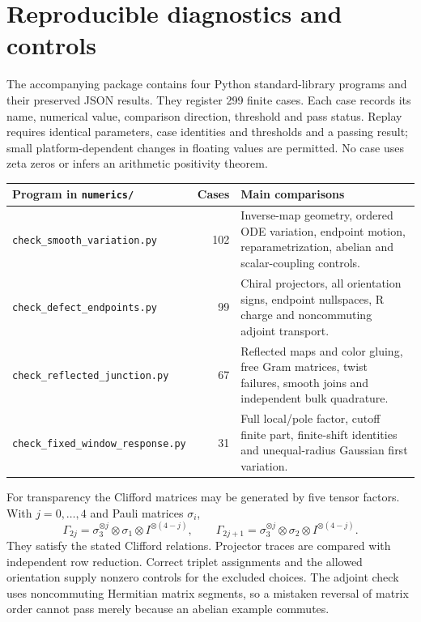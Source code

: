 \section{Reproducible diagnostics and controls}\label{app:diagnostics}

The accompanying package contains four Python standard-library
programs and their preserved JSON results. They register 299 finite
cases. Each case records its name, numerical value, comparison
direction, threshold and pass status. Replay requires identical
parameters, case identities and thresholds and a passing result;
small platform-dependent changes in floating values are permitted.
No case uses zeta zeros or infers an arithmetic positivity theorem.

\begin{center}
\begin{tabular}{@{}p{}rp{}@{}}
\toprule
Program in \texttt{numerics/} & Cases & Main comparisons\\
\midrule
\nolinkurl{check_smooth_variation.py} & 102 &
Inverse-map geometry, ordered ODE variation, endpoint motion,
reparametrization, abelian and scalar-coupling controls.\\
\nolinkurl{check_defect_endpoints.py} & 99 &
Chiral projectors, all orientation signs, endpoint nullspaces,
R charge and noncommuting adjoint transport.\\
\nolinkurl{check_reflected_junction.py} & 67 &
Reflected maps and color gluing, free Gram matrices, twist failures,
smooth joins and independent bulk quadrature.\\
\nolinkurl{check_fixed_window_response.py} & 31 &
Full local/pole factor, cutoff finite part, finite-shift identities
and unequal-radius Gaussian first variation.\\
\bottomrule
\end{tabular}
\end{center}

For transparency the Clifford matrices may be generated by five
tensor factors. With $j=0,\ldots,4$ and Pauli matrices $\sigma_i$,
\begin{equation}
 \Gamma_{2j}=\sigma_3^{\otimes j}\otimes\sigma_1\otimes I^{\otimes(4-j)},
 \qquad
 \Gamma_{2j+1}=\sigma_3^{\otimes j}\otimes\sigma_2\otimes I^{\otimes(4-j)}.
\end{equation}
They satisfy the stated Clifford relations. Projector traces are
compared with independent row reduction. Correct triplet assignments
and the allowed orientation supply nonzero controls for the excluded
choices. The adjoint check uses noncommuting Hermitian matrix segments,
so a mistaken reversal of matrix order cannot pass merely because an
abelian example commutes.


